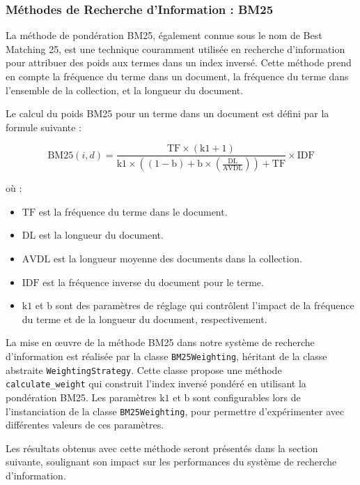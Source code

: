 \documentclass[a4paper, 12pt]{article}
\begin{document}
\subsubsection{Méthodes de Recherche d'Information : BM25}

La méthode de pondération BM25, également connue sous le nom de Best Matching 25,
est une technique couramment utilisée en recherche d'information pour attribuer des poids aux termes dans un index inversé.
Cette méthode prend en compte la fréquence du terme dans un document, la fréquence du terme dans l'ensemble de la collection,
et la longueur du document.

Le calcul du poids BM25 pour un terme dans un document est défini par la formule suivante :

\begin{equation}
\text{BM25}(i, d) = \frac{{\text{TF} \times (\text{k1} + 1)}}{{\text{k1} \times \left((1 - \text{b}) + \text{b} \times \left(\frac{\text{DL}}{\text{AVDL}}\right)\right) + \text{TF}}} \times \text{IDF}
\end{equation}

où :
\begin{itemize}
    \item $\text{TF}$ est la fréquence du terme dans le document.
    \item $\text{DL}$ est la longueur du document.
    \item $\text{AVDL}$ est la longueur moyenne des documents dans la collection.
    \item $\text{IDF}$ est la fréquence inverse du document pour le terme.
    \item $\text{k1}$ et $\text{b}$ sont des paramètres de réglage qui contrôlent l'impact de la fréquence du terme et de la longueur du document, respectivement.
\end{itemize}

La mise en œuvre de la méthode BM25 dans notre système de recherche d'information est réalisée par la 
classe \texttt{BM25Weighting}, héritant de la classe abstraite \texttt{WeightingStrategy}. Cette classe propose une méthode \texttt{calculate\_weight} 
qui construit l'index inversé pondéré en utilisant la pondération BM25. 
Les paramètres $\text{k1}$ et $\text{b}$ sont configurables lors de l'instanciation de la classe \texttt{BM25Weighting}, 
pour permettre d'expérimenter avec différentes valeurs de ces paramètres.

Les résultats obtenus avec cette méthode seront présentés dans la section suivante,
soulignant son impact sur les performances du système de recherche d'information.
\end{document}

